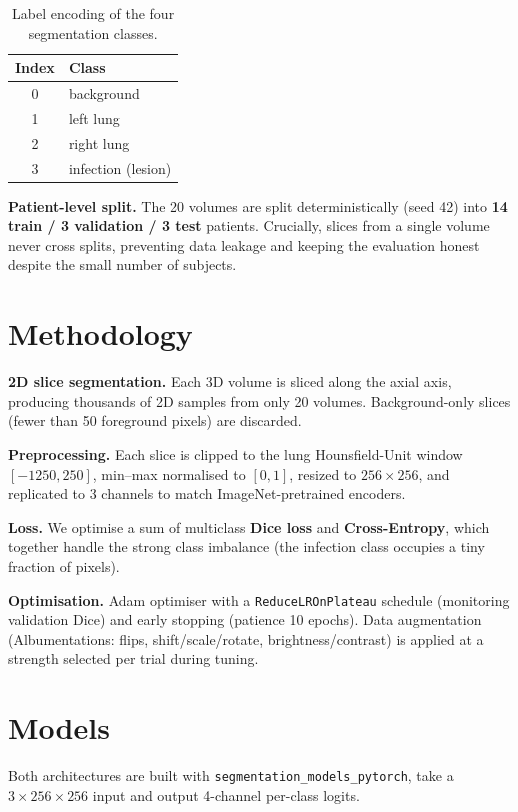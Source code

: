 \documentclass[11pt,a4paper]{article}
\begin{document}
\begin{table}[H]
\centering
\caption{Label encoding of the four segmentation classes.}
\label{tab:classes}
\begin{tabular}{cl}
\toprule
Index & Class \\
\midrule
0 & background \\
1 & left lung \\
2 & right lung \\
3 & infection (lesion) \\
\bottomrule
\end{tabular}
\end{table}

\textbf{Patient-level split.} The 20 volumes are split deterministically (seed 42) into
\textbf{14 train / 3 validation / 3 test} patients. Crucially, slices from a single volume
never cross splits, preventing data leakage and keeping the evaluation honest despite the
small number of subjects.

\section{Methodology}
\textbf{2D slice segmentation.} Each 3D volume is sliced along the axial axis, producing
thousands of 2D samples from only 20 volumes. Background-only slices (fewer than 50
foreground pixels) are discarded.

\textbf{Preprocessing.} Each slice is clipped to the lung Hounsfield-Unit window
$[-1250, 250]$, min--max normalised to $[0,1]$, resized to $256\times256$, and replicated
to 3 channels to match ImageNet-pretrained encoders.

\textbf{Loss.} We optimise a sum of multiclass \textbf{Dice loss} and
\textbf{Cross-Entropy}, which together handle the strong class imbalance (the infection
class occupies a tiny fraction of pixels).

\textbf{Optimisation.} Adam optimiser with a \texttt{ReduceLROnPlateau} schedule
(monitoring validation Dice) and early stopping (patience 10 epochs). Data augmentation
(Albumentations: flips, shift/scale/rotate, brightness/contrast) is applied at a strength
selected per trial during tuning.

\section{Models}
Both architectures are built with \texttt{segmentation\_models\_pytorch}, take a
$3\times256\times256$ input and output 4-channel per-class logits.
\end{document}
